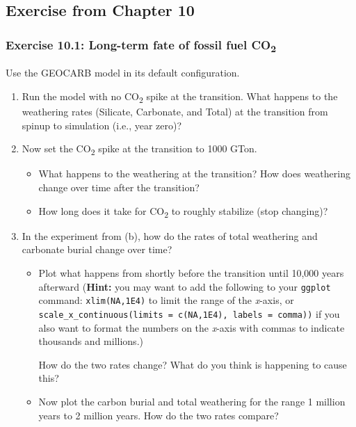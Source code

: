 \documentclass[
]{article}
\begin{document}
\hypertarget{exercise-from-chapter-10}{%
\subsection{Exercise from Chapter 10}\label{exercise-from-chapter-10}}

\hypertarget{exercise-10.1-long-term-fate-of-fossil-fuel-co2}{%
\subsubsection{\texorpdfstring{Exercise 10.1: Long-term fate of fossil
fuel
CO\textsubscript{2}}{Exercise 10.1: Long-term fate of fossil fuel CO2}}\label{exercise-10.1-long-term-fate-of-fossil-fuel-co2}}

Use the GEOCARB model in its default configuration.

\begin{enumerate}
\def\labelenumi{\alph{enumi})}
\item
  Run the model with no CO\textsubscript{2} spike at the transition.
  What happens to the weathering rates (Silicate, Carbonate, and Total)
  at the transition from spinup to simulation (i.e., year zero)?
\item
  Now set the CO\textsubscript{2} spike at the transition to 1000 GTon.

  \begin{itemize}
  \item
    What happens to the weathering at the transition? How does
    weathering change over time after the transition?
  \item
    How long does it take for CO\textsubscript{2} to roughly stabilize
    (stop changing)?
  \end{itemize}
\item
  In the experiment from (b), how do the rates of total weathering and
  carbonate burial change over time?

  \begin{itemize}
  \item
    Plot what happens from shortly before the transition until 10,000
    years afterward (\textbf{Hint:} you may want to add the following to
    your \texttt{ggplot} command: \texttt{xlim(NA,1E4)} to limit the
    range of the \emph{x}-axis, or
    \texttt{scale\_x\_continuous(limits\ =\ c(NA,1E4),\ labels\ =\ comma))}
    if you also want to format the numbers on the \emph{x}-axis with
    commas to indicate thousands and millions.)

    How do the two rates change? What do you think is happening to cause
    this?
  \item
    Now plot the carbon burial and total weathering for the range 1
    million years to 2 million years. How do the two rates compare?
  \end{itemize}
\end{enumerate}
\end{document}
